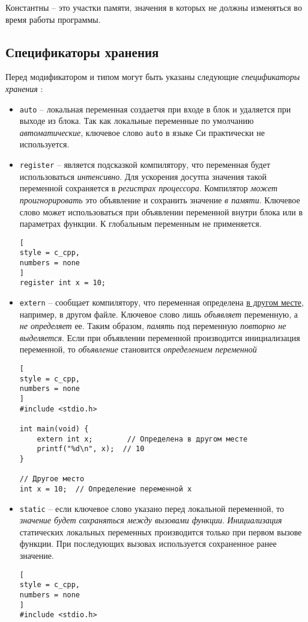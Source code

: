 \documentclass[%
	11pt,
	a4paper,
	utf8,
		]{article}
\begin{document}
Константны -- это участки памяти, значения в которых не должны изменяться во время работы программы.

\subsection{Спецификаторы хранения}

Перед модификатором и типом могут быть указаны следующие \emph{спецификаторы хранения} \cite[]{prokhorenok-prog-c:2020}:
\begin{itemize}
	\item \verb*|auto| -- локальная переменная создаетчя при входе в блок и удаляется при выходе из блока. Так как локальные переменные по умолчанию \emph{автоматические}, ключевое слово \verb|auto| в языке Си практически не используется.
	
	\item \verb*|register| -- является подсказкой компилятору, что переменная будет использоваться \emph{интенсивно}. Для ускорения досутпа значения такой переменной сохраняется в \emph{регистрах процессора}. Компилятор \emph{может проигнорировать} это объявление и сохранить значение \emph{в памяти}. Ключевое слово может использоваться при объявлении переменной внутри блока или в параметрах функции. К глобальным переменным не применяется.
\begin{lstlisting}[
style = c_cpp,
numbers = none
]
register int x = 10;
\end{lstlisting}
    \item \verb|extern| -- сообщает компилятору, что переменная определена \underline{в другом месте}, например, в другом файле. Ключевое слово лишь \emph{объявляет} переменную, а \emph{не определяет} ее. Таким образом, \emph{память} под переменную \emph{повторно не выделяется}. Если при объявлении переменной производится инициализация переменной, то \emph{объявление}  становится \emph{определением переменной}
\begin{lstlisting}[
style = c_cpp,
numbers = none
]
#include <stdio.h>

int main(void) {
    extern int x;        // Определена в другом месте
    printf("%d\n", x);  // 10
}

// Другое место
int x = 10;  // Определение переменной x
\end{lstlisting}
    \item \verb*|static| -- если ключевое слово указано перед локальной переменной, то \emph{значение будет сохраняться между вызовами функции}. \emph{Инициализация} статических локальных переменных производится только при первом вызове функции. При последующих вызовах используется сохраненное ранее значение.
\begin{lstlisting}[
style = c_cpp,
numbers = none
]
#include <stdio.h>


\end{lstlisting}
\end{itemize}
\end{document}
